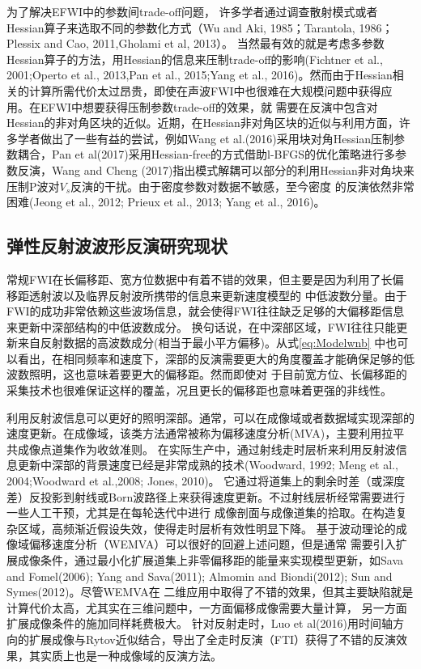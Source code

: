 为了解决EFWI中的参数间trade-off问题，
许多学者通过调查散射模式或者Hessian算子来选取不同的参数化方式（Wu and Aki, 1985\cite{wu.aki:1985}；Tarantola, 1986\cite{tarantola:1986}；
Plessix and Cao, 2011\cite{plessix.cao:2011},Gholami et al, 2013\cite{gholami2013}）。
当然最有效的就是考虑多参数Hessian算子的方法，用Hessian的信息来压制trade-off的影响(Fichtner et al., 2001\cite{fichtner2011hessian};Operto et al.,
2013\cite{operto2013guided},Pan et al., 2015\cite{pan2015estimation};Yang et al.,
2016\cite{Yang2016})。然而由于Hessian相关的计算所需代价太过昂贵，即使在声波FWI中也很难在大规模问题中获得应用。在EFWI中想要获得压制参数trade-off的效果，就
需要在反演中包含对Hessian的非对角区块的近似。近期，在Hessian非对角区块的近似与利用方面，许多学者做出了一些有益的尝试，例如Wang
et al.(2016)\cite{WangYuweiEtAl2016}采用块对角Hessian压制参数耦合，Pan et
al(2017)\cite{PanEtAl2017}采用Hessian-free的方式借助l-BFGS的优化策略进行多参数反演，Wang and Cheng
(2017)\cite{WangEtAl2017}指出模式解耦可以部分的利用Hessian非对角块来压制P波对$V_s$反演的干扰。由于密度参数对数据不敏感，至今密度
的反演依然非常困难(Jeong et al., 2012\cite{jeong2012full}; Prieux et al., 2013\cite{prieux:2013a}; Yang
et al., 2016\cite{Yang2016})。
\subsection{弹性反射波波形反演研究现状}
常规FWI在长偏移距、宽方位数据中有着不错的效果，但主要是因为利用了长偏移距透射波以及临界反射波所携带的信息来更新速度模型的
中低波数分量。由于FWI的成功非常依赖这些波场信息，就会使得FWI往往缺乏足够的大偏移距信息来更新中深部结构的中低波数成分。
换句话说，在中深部区域，FWI往往只能更新来自反射数据的高波数成分(相当于最小平方偏移)。从式\ref{eq:Modelwnb}
中也可以看出，在相同频率和速度下，深部的反演需要更大的角度覆盖才能确保足够的低波数照明，这也意味着要更大的偏移距。然而即使对
于目前宽方位、长偏移距的采集技术也很难保证这样的覆盖，况且更长的偏移距也意味着更强的非线性\cite{sirgue2006importance,virieux2009overview}。

利用反射波信息可以更好的照明深部。通常，可以在成像域或者数据域实现深部的速度更新。在成像域，该类方法通常被称为偏移速度分析(MVA)，主要利用拉平
共成像点道集作为收敛准则。
在实际生产中，通过射线走时层析来利用反射波信息更新中深部的背景速度已经是非常成熟的技术(Woodward,
1992\cite{Woodward1992}; Meng et al., 2004\cite{MengEtAl2004};Woodward et al.,2008\cite{
Woodward2008}; Jones, 2010\cite{Jones2010})。
它通过将道集上的剩余时差（或深度差）反投影到射线或Born波路径上来获得速度更新。不过射线层析经常需要进行一些人工干预，尤其是在每轮迭代中进行
成像剖面与成像道集的拾取。在构造复杂区域，高频渐近假设失效，使得走时层析有效性明显下降。
基于波动理论的成像域偏移速度分析（WEMVA）可以很好的回避上述问题，但是通常
需要引入扩展成像条件，通过最小化扩展道集上非零偏移距的能量来实现模型更新，如Sava and
Fomel(2006)\cite{SavaEtAl2006}; Yang and Sava(2011)\cite{YangEtAl2011}; Almomin and
Biondi(2012)\cite{Almomin2012}; Sun and Symes(2012)\cite{SunEtAl2012}。尽管WEMVA在
二维应用中取得了不错的效果，但其主要缺陷就是计算代价太高，尤其实在三维问题中，一方面偏移成像需要大量计算，
另一方面扩展成像条件的施加同样耗费极大。
针对反射走时，Luo et
al(2016)\cite{Luo2016}用时间轴方向的扩展成像与Rytov近似结合，导出了全走时反演（FTI）获得了不错的反演效果，其实质上也是一种成像域的反演方法。

